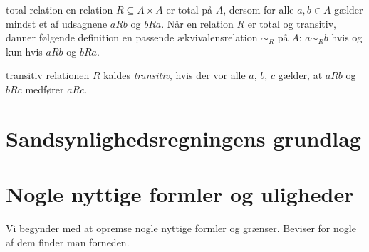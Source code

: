 \begin{mydescription}
  \item[total relation]
    en relation $R \subseteq A\times A$ er total på $A$, dersom for alle $a,b\in A$ gælder mindst et af udsagnene $aR b$ og $bR a$.
    Når en relation $R$ er  total og transitiv, danner følgende definition en passende ækvivalensrelation $\sim_R$ på $A$: 
    $a \sim_R b$ hvis og kun hvis $aRb$ og $bRa$.

  \item[transitiv]
    relationen $R$ kaldes \emph{transitiv}, hvis der vor alle $a$, $b$, $c$ gælder, at $aR b$ og $bRc$ medfører $aR c$. 


\end{mydescription}

\section{Sandsynlighedsregningens grundlag}

\section{Nogle nyttige formler og uligheder}

Vi begynder med at opremse nogle nyttige formler og grænser.
Beviser for nogle af dem finder man forneden.

